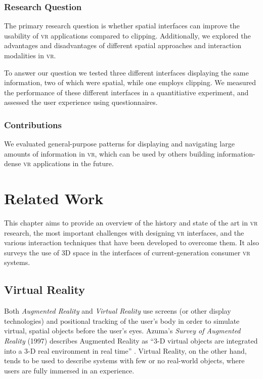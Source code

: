 \documentclass[nobib]{tufte-book} %
\begin{document}

\subsection{Research Question}
The primary research question is whether spatial interfaces can improve the usability of \textsc{vr} applications compared to clipping. Additionally, we explored the advantages and disadvantages of different spatial approaches and interaction modalities in \textsc{vr}.

To answer our question we tested three different interfaces displaying the same information, two of which were spatial, while one employs clipping. We measured the performance of these different interfaces in a quantitiative experiment, and assessed the user experience using questionnaires.

\subsection{Contributions}
We evaluated general-purpose patterns for displaying and navigating large amounts of information in \textsc{vr}, which can be used by others building information-dense \textsc{vr} applications in the future.


\chapter{Related Work}
\label{ch:related-work}

This chapter aims to provide an overview of the history and state of the art in \textsc{vr} research, the most important challenges with designing \textsc{vr} interfaces, and the various interaction techniques that have been developed to overcome them. It also surveys the use of 3D space in the interfaces of current-generation consumer \textsc{vr} systems.

\section{Virtual Reality}
Both \emph{Augmented Reality} and \emph{Virtual Reality} use screens (or other display technologies) and positional tracking of the user's body in order to simulate virtual, spatial objects before the user's eyes. Azuma's \emph{Survey of Augmented Reality} (1997) describes Augmented Reality as ``3-D virtual objects are integrated into a 3-D real environment in real time'' \cite{azuma1997survey}. Virtual Reality, on the other hand, tends to be used to describe systems with few or no real-world objects, where users are fully immersed in an experience.
\end{document}
